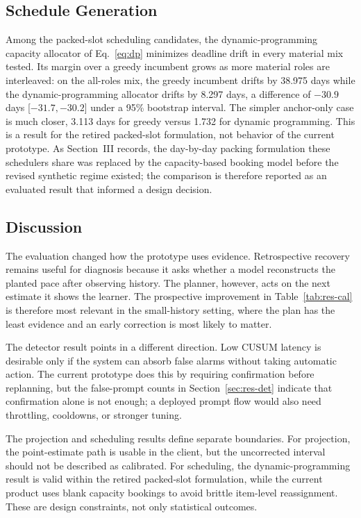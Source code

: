 \documentclass[conference]{IEEEtran}
\begin{document}
\subsection{Schedule Generation}
\label{sec:res-sched}
Among the packed-slot scheduling candidates, the dynamic-programming capacity allocator of Eq.~\eqref{eq:dp} minimizes deadline drift in every material mix tested. Its margin over a greedy incumbent grows as more material roles are interleaved: on the all-roles mix, the greedy incumbent drifts by 38.975 days while the dynamic-programming allocator drifts by 8.297 days, a difference of $-30.9$ days [$-31.7,-30.2$] under a 95\% bootstrap interval. The simpler anchor-only case is much closer, 3.113 days for greedy versus 1.732 for dynamic programming. This is a result for the retired packed-slot formulation, not behavior of the current prototype. As Section~III records, the day-by-day packing formulation these schedulers share was replaced by the capacity-based booking model before the revised synthetic regime existed; the comparison is therefore reported as an evaluated result that informed a design decision.

\subsection{Discussion}
\label{sec:res-discuss}
The evaluation changed how the prototype uses evidence. Retrospective recovery remains useful for diagnosis because it asks whether a model reconstructs the planted pace after observing history. The planner, however, acts on the next estimate it shows the learner. The prospective improvement in Table~\ref{tab:res-cal} is therefore most relevant in the small-history setting, where the plan has the least evidence and an early correction is most likely to matter.

The detector result points in a different direction. Low CUSUM latency is desirable only if the system can absorb false alarms without taking automatic action. The current prototype does this by requiring confirmation before replanning, but the false-prompt counts in Section~\ref{sec:res-det} indicate that confirmation alone is not enough; a deployed prompt flow would also need throttling, cooldowns, or stronger tuning.

The projection and scheduling results define separate boundaries. For projection, the point-estimate path is usable in the client, but the uncorrected interval should not be described as calibrated. For scheduling, the dynamic-programming result is valid within the retired packed-slot formulation, while the current product uses blank capacity bookings to avoid brittle item-level reassignment. These are design constraints, not only statistical outcomes.
\end{document}
